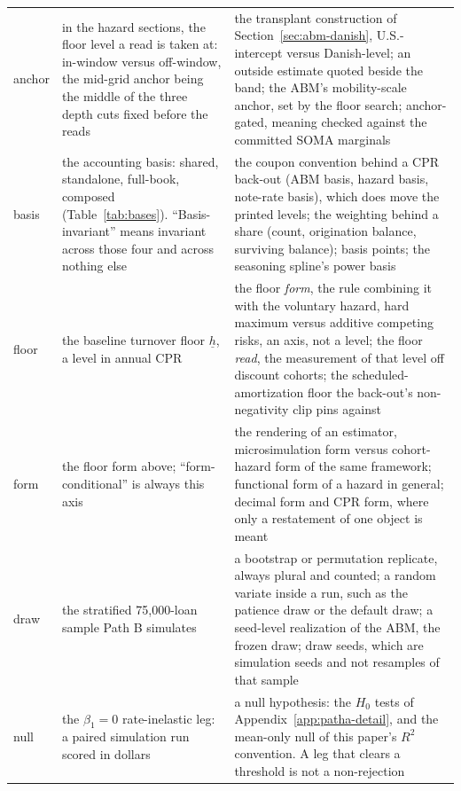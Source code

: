 \documentclass[12pt]{article}
\begin{document}
{\begin{longtable}{@{}p{1.5cm}p{6.2cm}p{6.2cm}@{}}
anchor & in the hazard sections, the floor level a read is taken at: in-window versus off-window, the mid-grid anchor being the middle of the three depth cuts fixed before the reads & the transplant construction of Section~\ref{sec:abm-danish}, U.S.-intercept versus Danish-level; an outside estimate quoted beside the band; the ABM's mobility-scale anchor, set by the floor search; anchor-gated, meaning checked against the committed SOMA marginals \\
basis & the accounting basis: shared, standalone, full-book, composed (Table~\ref{tab:bases}). ``Basis-invariant'' means invariant across those four and across nothing else & the coupon convention behind a CPR back-out (ABM basis, hazard basis, note-rate basis), which does move the printed levels; the weighting behind a share (count, origination balance, surviving balance); basis points; the seasoning spline's power basis \\
floor & the baseline turnover floor $\underline{h}$, a level in annual CPR & the floor \emph{form}, the rule combining it with the voluntary hazard, hard maximum versus additive competing risks, an axis, not a level; the floor \emph{read}, the measurement of that level off discount cohorts; the scheduled-amortization floor the back-out's non-negativity clip pins against \\
form & the floor form above; ``form-conditional'' is always this axis & the rendering of an estimator, microsimulation form versus cohort-hazard form of the same framework; functional form of a hazard in general; decimal form and CPR form, where only a restatement of one object is meant \\
draw & the stratified 75{,}000-loan sample Path B simulates & a bootstrap or permutation replicate, always plural and counted; a random variate inside a run, such as the patience draw or the default draw; a seed-level realization of the ABM, the frozen draw; draw seeds, which are simulation seeds and not resamples of that sample \\
null & the $\beta_1 = 0$ rate-inelastic leg: a paired simulation run scored in dollars & a null hypothesis: the $H_0$ tests of Appendix~\ref{app:patha-detail}, and the mean-only null of this paper's $R^2$ convention. A leg that clears a threshold is not a non-rejection \\
\bottomrule
\end{longtable}
}

\end{document}
